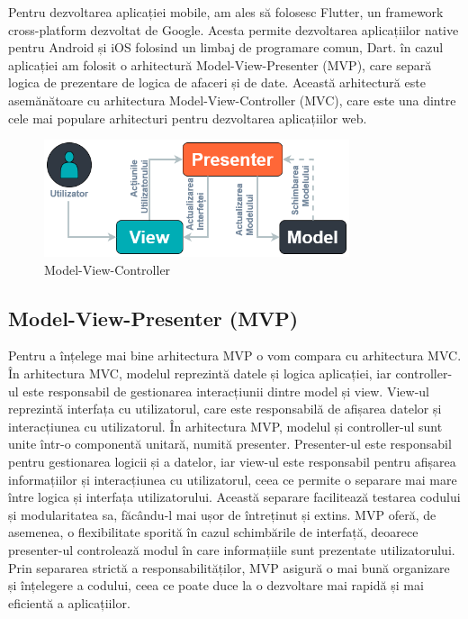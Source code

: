 Pentru dezvoltarea aplicației mobile, am ales să folosesc Flutter, un framework cross-platform dezvoltat de Google. Acesta permite dezvoltarea aplicațiilor native pentru Android și iOS folosind un limbaj de programare comun, Dart. în cazul aplicației am folosit o arhitectură Model-View-Presenter (MVP), care separă logica de prezentare de logica de afaceri și de date. Această arhitectură este asemănătoare cu arhitectura Model-View-Controller (MVC), care este una dintre cele mai populare arhitecturi pentru dezvoltarea aplicațiilor web. 

\begin{figure}[ht]
    \centering
    \includegraphics[width=0.8\textwidth] {images/mvc.png}
    \caption{Model-View-Controller{\cite{mvc}}}
    \label{fig:mvc}
\end{figure}

\subsection{Model-View-Presenter (MVP)}

Pentru a înțelege mai bine arhitectura MVP o vom compara cu arhitectura MVC. În arhitectura MVC, modelul reprezintă datele și logica aplicației, iar controller-ul este responsabil de gestionarea interacțiunii dintre model și view. View-ul reprezintă interfața cu utilizatorul, care este responsabilă de afișarea datelor și interacțiunea cu utilizatorul. În arhitectura MVP, modelul și controller-ul sunt unite într-o componentă unitară, numită presenter. Presenter-ul este responsabil pentru gestionarea logicii și a datelor, iar view-ul este responsabil pentru afișarea informațiilor și interacțiunea cu utilizatorul, ceea ce permite o separare mai mare între logica și interfața utilizatorului. Această separare facilitează testarea codului și modularitatea sa, făcându-l mai ușor de întreținut și extins. MVP oferă, de asemenea, o flexibilitate sporită în cazul schimbările de interfață, deoarece presenter-ul controlează modul în care informațiile sunt prezentate utilizatorului. Prin separarea strictă a responsabilităților, MVP asigură o mai bună organizare și înțelegere a codului, ceea ce poate duce la o dezvoltare mai rapidă și mai eficientă a aplicațiilor.

